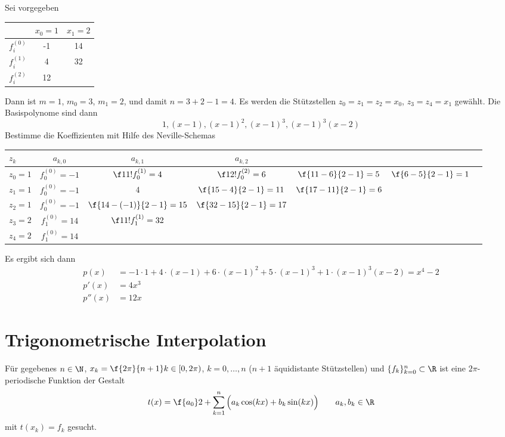 \documentclass[11pt]{scrbook}
\begin{document}
\begin{ex*}
	Sei vorgegeben

	\begin{table}[!ht]
		\centering	
		\begin{tabular}{l|c|c}
			 & $x_0=1$ & $x_1 =2$ \\ \hline
			$f_i^{(0)}$ & -1 & 14 \\
			$f_i^{(1)}$ & 4 & 32 \\
			$f_i^{(2)}$ & 12 & 
		\end{tabular}		
	\end{table}

	Dann ist $m=1$, $m_0=3$, $m_1=2$, und damit $n=3+2-1=4$.
	Es werden die Stützstellen $z_0=z_1=z_2=x_0$, $z_3=z_4=x_1$ gewählt.
	Die Basispolynome sind dann
	\[
		1, (x-1), (x-1)^2, (x-1)^3, (x-1)^3(x-2)
	\]
	Bestimme die Koeffizienten mit Hilfe des Neville-Schemas

	\begin{table}[!ht]
		\centering	
		\begin{tabular}{l|c|c|c|c|c|c}
			$z_k$  & $a_{k,0}$ & $a_{k,1}$ & $a_{k,2}$ \\ \hline
			$z_0=1$ & $f_0^{(0)} = -1$  & $\f 1{1!}f_0^{(1)} = 4$ & $\f 1{2!} f_0^{(2)} = 6$ & $\f {11-6}{2-1}=5$ & $\f {6-5}{2-1}=1$ \\
			$z_1=1$ & $f_0^{(0)} = -1$ & $4$ 						&	$\f {15-4}{2-1} = 11$ & $\f {17-11}{2-1}=6$ \\
			$z_2=1$ & $f_0^{(0)} = -1$ & $\f {14-(-1)}{2-1} = 15$ & $\f {32-15}{2-1} = 17$ \\
			$z_3=2$ & $f_1^{(0)} = 14$ & $\f 1 {1!} f_1^{(1)} = 32$ &  \\
			$z_4=2$ & $f_1^{(0)} = 14$ & 
		\end{tabular}		
	\end{table}
	Es ergibt sich dann
	\begin{align*}
		p(x)& = -1\cdot 1 + 4\cdot (x-1) + 6\cdot(x-1)^2 + 5\cdot(x-1)^3 + 1\cdot(x-1)^3 (x-2) = x^4-2\\
		p'(x) &= 4x^3\\
		p''(x) &= 12x
	\end{align*}
\end{ex*}


\section{Trigonometrische Interpolation}

Für gegebenes $n\in \N$, $x_k = \f {2\pi}{n+1}k \in [0,2\pi)$, $k=0,\dotsc,n$ ($n+1$ äquidistante Stützstellen) und $\{f_k\}_{k=0}^n\subset \R$ ist eine $2\pi$-periodische Funktion der Gestalt
\[
	t(x) = \f {a_0}2 + \sum_{k=1}^n \Big(a_k \cos(kx) + b_k \sin(kx) \Big) \qquad a_k,b_k \in \R
\]
mit $t(x_k)=f_k$ gesucht.
\end{document}
